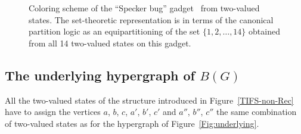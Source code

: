 \documentclass[%
12pt,
prereprint,
showpacs,
showkeys,
preprintnumbers,
amsmath,amssymb,
aps,
pra,
longbibliography,
notitlepage
]{revtex4-1}
\theoremstyle{definition}
\begin{document}
\begin{figure}
\begin{center}
                \end{center}
                \caption{\label{2020-f-SpeckerBug}
                        Coloring scheme of the ``Specker bug'' gadget~\cite{kochen2,Greechie1974} from two-valued states.
                        The set-theoretic representation is in terms of
                        the canonical partition logic as an equipartitioning of the set $\{1,2,\ldots,14\}$
                        obtained from all 14 two-valued states on this gadget.
                }
        \end{figure}

        \subsection{The underlying hypergraph of $B(G)$}\label{sec:underlying}

        All the two-valued states of the structure introduced in Figure~\ref{TIFS-non-Rec} have to assign the vertices $a$, $b$, $c$, $a'$, $b'$, $c'$ and $a''$, $b''$, $c''$ the same combination of two-valued states as for the hypergraph of Figure~\ref{Fig:underlying}.
\end{document}

